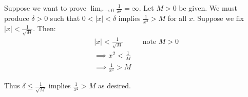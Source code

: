 \vs

Suppose we want to prove $\lim_{x\to0}\frac{1}{x^{2}}=\infty$. Let
$M>0$ be given. We must produce $\delta>0$ such that $0<|x|<\delta$ implies
$\frac{1}{x^2}>M$ for all $x$. Suppose we fix
$|x|<\frac{1}{\sqrt{M}}$. Then:
\begin{align*}
  &|x|<\frac{1}{\sqrt{M}}&&\text{note $M>0$}\\
  &\implies x^2<\frac{1}{M}\\
  &\implies \frac{1}{x^2}>M
\end{align*}

Thus $\delta\leq \frac{1}{\sqrt{M}}$ implies $\frac{1}{x^2}>M$ as desired.

